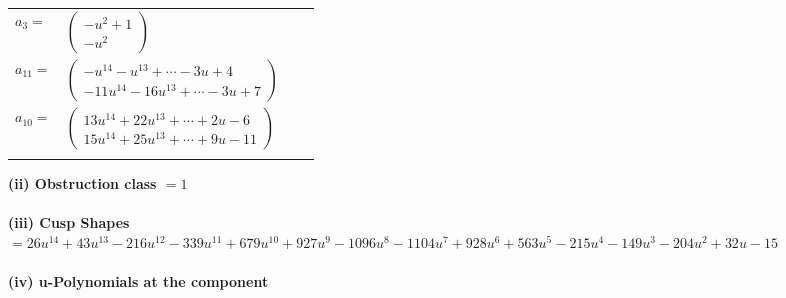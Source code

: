 \documentclass[1p]{elsarticle_modified}
\theoremstyle{definition}
\begin{document}
\begin{tabular}{m{7pt} m{180pt} m{7pt} m{180pt} }
\flushright $a_{3}=$&$\begin{pmatrix}- u^2+1\\- u^2\end{pmatrix}$ \\
\flushright $a_{11}=$&$\begin{pmatrix}- u^{14}- u^{13}+\cdots-3 u+4\\-11 u^{14}-16 u^{13}+\cdots-3 u+7\end{pmatrix}$ \\
\flushright $a_{10}=$&$\begin{pmatrix}13 u^{14}+22 u^{13}+\cdots+2 u-6\\15 u^{14}+25 u^{13}+\cdots+9 u-11\end{pmatrix}$\\&\end{tabular}
\flushleft \textbf{(ii) Obstruction class $= 1$}\\~\\
\flushleft \textbf{(iii) Cusp Shapes $= 26 u^{14}+43 u^{13}-216 u^{12}-339 u^{11}+679 u^{10}+927 u^9-1096 u^8-1104 u^7+928 u^6+563 u^5-215 u^4-149 u^3-204 u^2+32 u-15$}\\~\\
\newpage\renewcommand{\arraystretch}{1}
\flushleft \textbf{(iv) u-Polynomials at the component}\newline \\
\end{document}
